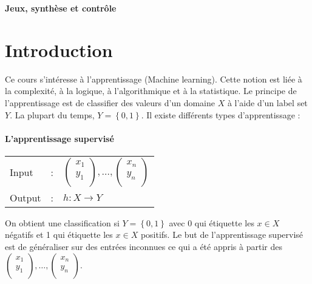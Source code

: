 \documentclass{article}
\begin{document}
\begin{center}
\Large{\textbf{Jeux, synthèse et contrôle}}
\end{center}

\section*{Introduction}
Ce cours s'intéresse à l'apprentissage (Machine learning). Cette notion est liée
à la complexité, à la logique, à l'algorithmique et à la statistique. Le principe
de l'apprentissage est de classifier des valeurs d'un domaine $X$ à l'aide d'un
label set $Y$. La plupart du temps, $Y=\left\{0,1\right\}$. Il existe différents
types d'apprentissage :

    \paragraph{L'apprentissage supervisé}
        \begin{tabular}{l c l}
         Input & : & $\begin{pmatrix}
                         x_1 \\
                         y_1 \\
                     \end{pmatrix}, \dots,
                         \begin{pmatrix}
                         x_n \\
                         y_n \\
                         \end{pmatrix}$ \\
        Output & : & $h : X \rightarrow Y$\\
        \end{tabular}

    On obtient une classification si $Y=\left\{0,1\right\}$ avec 0 qui étiquette
    les $x\in X$ négatifs et 1 qui étiquette les $x\in X$ positifs. Le but de
    l'apprentissage supervisé est de généraliser sur des entrées inconnues ce qui
    a été appris à partir des $\begin{pmatrix}
                    x_1 \\
                    y_1 \\
                \end{pmatrix}, \dots,
                    \begin{pmatrix}
                    x_n \\
                    y_n \\
                    \end{pmatrix}$.
\end{document}
